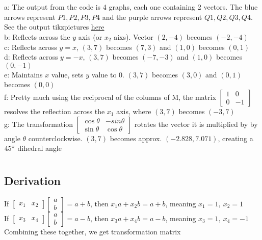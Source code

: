 \documentclass{article}
\begin{document}
\section{}
a: The output from the code is 4 graphs, each one containing 2 vectors. The blue arrows represent $P1, P2, P3, P4$ and the purple arrows represent $Q1,Q2,Q3,Q4$. See the output tikzpictures \hyperref[sec:intro]{here}
\\[0.05in]b: Reflects across the $y$ axis (or $x_2$ aixs). Vector $(2,-4)$ becomes $(-2,-4)$
\\[0.05in]c: Reflects across $y=x$, $(3,7)$ becomes $(7,3)$ and $(1,0)$ becomes $(0,1)$
\\[0.05in]d: Reflects across $y=-   x$, $(3,7)$ becomes $(-7,-3)$ and $(1,0)$ becomes $(0,-1)$
\\[0.05in]e: Maintains $x$ value, sets $y$ value to $0$. $(3,7)$ becomes $(3,0)$ and $(0,1)$ becomes $(0,0)$
\\[0.05in]f: Pretty much using the reciprocal of the columns of M, the matrix $\begin{bmatrix}1&0\\0&-1\end{bmatrix}$ resolves the reflection across the $x_1$ axis, where $(3,7)$ becomes $(-3,7)$
\\[0.05in]g: The transformation $\begin{bmatrix}\cos\theta&-sin\theta\\\sin\theta&\cos\theta\end{bmatrix}$ rotates the vector it is multiplied by by angle $\theta$ counterclockwise. $(3,7)$ becomes approx. $(-2.828, 7.071)$, creating a $45\degree$ dihedral angle
\pagebreak
\section{}
\subsection{Derivation}
If $\begin{bmatrix}x_1&x_2\end{bmatrix}\begin{bmatrix}a\\b\end{bmatrix} = a+b$, then $x_1a+x_2b=a+b$, meaning $x_1=1,~x_2=1$
\\[0.05in]If $\begin{bmatrix}x_3&x_4\end{bmatrix}\begin{bmatrix}a\\b\end{bmatrix} = a-b$, then $x_3a+x_4b=a-b$, meaning $x_3=1,~x_4=-1$
\\Combining these together, we get transformation matrix 
\end{document}
